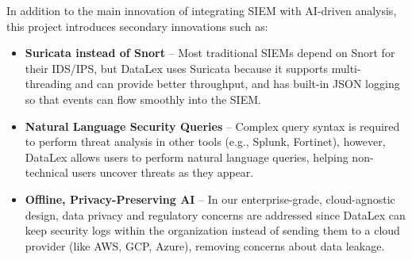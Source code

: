 In addition to the main innovation of integrating SIEM with AI-driven analysis, this project introduces secondary innovations such as:

\begin{itemize}
    \item \textbf{Suricata instead of Snort} -- Most traditional SIEMs depend on Snort for their IDS/IPS, but DataLex uses Suricata because it supports multi-threading and can provide better throughput, and has built-in JSON logging so that events can flow smoothly into the SIEM.
    \item \textbf{Natural Language Security Queries} -- Complex query syntax is required to perform threat analysis in other tools (e.g., Splunk, Fortinet), however, DataLex allows users to perform natural language queries, helping non-technical users uncover threats as they appear.
    \item \textbf{Offline, Privacy-Preserving AI} -- In our enterprise-grade, cloud-agnostic design, data privacy and regulatory concerns are addressed since DataLex can keep security logs within the organization instead of sending them to a cloud provider (like AWS, GCP, Azure), removing concerns about data leakage.
\end{itemize}
